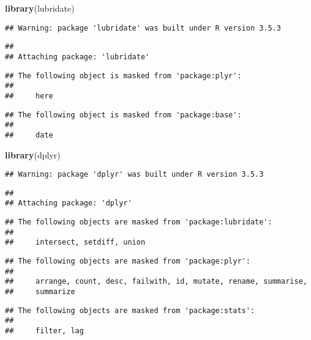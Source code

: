 \documentclass[]{article}
\newenvironment{Shaded}{\begin{snugshade}}{\end{snugshade}}
\newcommand{\KeywordTok}[1]{\textcolor[rgb]{0.13,0.29,0.53}{\textbf{#1}}}
\newcommand{\NormalTok}[1]{#1}
\begin{document}
\begin{Shaded}
\begin{Highlighting}[]
\KeywordTok{library}\NormalTok{(lubridate)}
\end{Highlighting}
\end{Shaded}

\begin{verbatim}
## Warning: package 'lubridate' was built under R version 3.5.3
\end{verbatim}

\begin{verbatim}
## 
## Attaching package: 'lubridate'
\end{verbatim}

\begin{verbatim}
## The following object is masked from 'package:plyr':
## 
##     here
\end{verbatim}

\begin{verbatim}
## The following object is masked from 'package:base':
## 
##     date
\end{verbatim}

\begin{Shaded}
\begin{Highlighting}[]
\KeywordTok{library}\NormalTok{(dplyr)}
\end{Highlighting}
\end{Shaded}

\begin{verbatim}
## Warning: package 'dplyr' was built under R version 3.5.3
\end{verbatim}

\begin{verbatim}
## 
## Attaching package: 'dplyr'
\end{verbatim}

\begin{verbatim}
## The following objects are masked from 'package:lubridate':
## 
##     intersect, setdiff, union
\end{verbatim}

\begin{verbatim}
## The following objects are masked from 'package:plyr':
## 
##     arrange, count, desc, failwith, id, mutate, rename, summarise,
##     summarize
\end{verbatim}

\begin{verbatim}
## The following objects are masked from 'package:stats':
## 
##     filter, lag
\end{verbatim}
\end{document}
